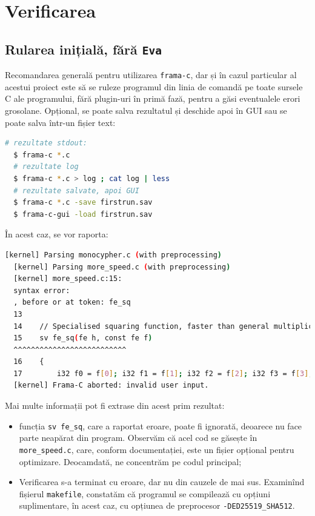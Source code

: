\chapter{Verificarea}


\section{Rularea inițială, fără \texttt{Eva}}

\indent\indent Recomandarea generală pentru utilizarea \texttt{frama-c}, dar și în cazul particular
al acestui proiect este să se ruleze programul din linia de comandă pe toate
sursele C ale programului, fără plugin-uri în primă fază, pentru a găsi eventualele
erori grosolane. Opțional, se poate salva rezultatul și deschide apoi în GUI sau se poate salva
într-un fișier text:

\begin{lstlisting}[language=sh,caption={\emph{Verificarea inițială a proiectului}},xleftmargin=.21\textwidth]
  # rezultate stdout:
  $ frama-c *.c
  # rezultate log
  $ frama-c *.c > log ; cat log | less
  # rezultate salvate, apoi GUI
  $ frama-c *.c -save firstrun.sav
  $ frama-c-gui -load firstrun.sav
\end{lstlisting}

În acest caz, se vor raporta:
\begin{lstlisting}[language=sh,caption={\emph{Rezultatele verificării inițiale}}]
  [kernel] Parsing monocypher.c (with preprocessing)
  [kernel] Parsing more_speed.c (with preprocessing)
  [kernel] more_speed.c:15: 
  syntax error:
  , before or at token: fe_sq
  13    
  14    // Specialised squaring function, faster than general multiplication.
  15    sv fe_sq(fe h, const fe f)
  ^^^^^^^^^^^^^^^^^^^^^^^^^^
  16    {
  17        i32 f0 = f[0]; i32 f1 = f[1]; i32 f2 = f[2]; i32 f3 = f[3]; i32 f4 = f[4];
  [kernel] Frama-C aborted: invalid user input.
\end{lstlisting}

Mai multe informații pot fi extrase din acest prim rezultat:
\begin{itemize}
\item funcția \texttt{sv fe\_sq}, care a raportat eroare, poate fi ignorată, deoarece
  nu face parte neapărat din program. Observăm că acel cod se găsește în \texttt{more\_speed.c}, care,
  conform documentației, este un fișier opțional pentru optimizare. Deocamdată, ne concentrăm
  pe codul principal;
\item Verificarea s-a terminat cu eroare, dar nu din cauzele de mai sus. Examinînd
  fișierul \texttt{makefile}, constatăm că programul se compilează cu opțiuni suplimentare,
  în acest caz, cu opțiunea de preprocesor \texttt{-DED25519\_SHA512}.
\end{itemize}

